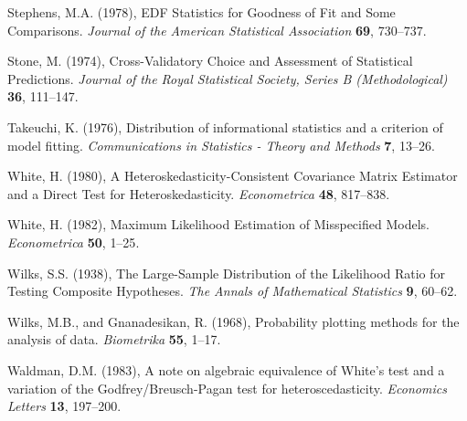 \rff Stephens, M.A. (1978),
      EDF Statistics for Goodness of Fit and Some Comparisons.
      {\it Journal of the American Statistical Association}
      {\bf 69}, {730--737}.

\phantom{a}

\rff Stone, M. (1974),
      Cross-Validatory Choice and Assessment of Statistical Predictions.
      {\it Journal of the Royal Statistical Society, Series B (Methodological)}
      {\bf 36}, {111--147}.

\phantom{a}

\rff Takeuchi, K. (1976),
      Distribution of informational statistics and a criterion of model fitting.
      {\it Communications in Statistics - Theory and Methods}
      {\bf 7}, {13--26}.

\phantom{a}

\rff White, H. (1980),
      A Heteroskedasticity-Consistent Covariance Matrix Estimator and a Direct Test for Heteroskedasticity.
      {\it Econometrica}
      {\bf 48}, {817--838}.

\phantom{a}

\rff White, H. (1982),
      Maximum Likelihood Estimation of Misspecified Models.
      {\it Econometrica}
      {\bf 50}, {1--25}.

\phantom{a}

\rff Wilks, S.S. (1938),
      The Large-Sample Distribution of the Likelihood Ratio for Testing Composite Hypotheses.
      {\it The Annals of Mathematical Statistics}
      {\bf 9}, {60--62}.

\phantom{a}

\rff Wilks, M.B., and Gnanadesikan, R. (1968),
      Probability plotting methods for the analysis of data.
      {\it Biometrika}
      {\bf 55}, {1--17}.

\phantom{a}

\rff Waldman, D.M. (1983),
      A note on algebraic equivalence of White's test and a variation of the Godfrey/Breusch-Pagan test for heteroscedasticity.
      {\it Economics Letters}
      {\bf 13}, {197--200}.


